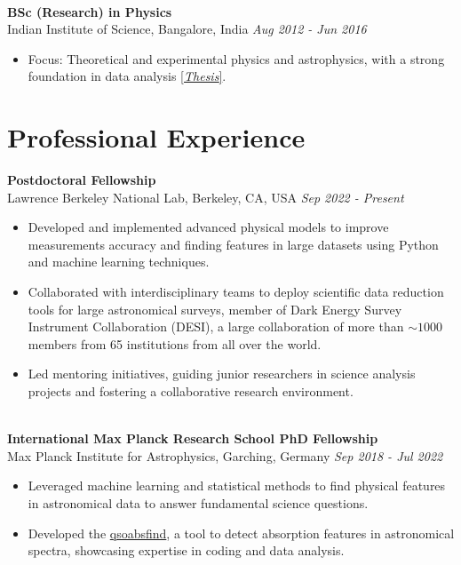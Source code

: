\documentclass[a4paper,10pt]{article}
\begin{document}
\noindent\\
\textbf{BSc (Research) in Physics} \\
Indian Institute of Science, Bangalore, India \hfill \textit{Aug 2012 - Jun 2016} \\
\begin{itemize}[noitemsep, topsep=0pt]
    \item Focus: Theoretical and experimental physics and astrophysics, with a strong foundation in data analysis \href{https://raw.githubusercontent.com/abhi0395/mycv/main/files/BS_thesis.pdf}{[\textit{Thesis}]}.
\end{itemize}

\section*{Professional Experience}
\noindent
\textbf{Postdoctoral Fellowship} \\
Lawrence Berkeley National Lab, Berkeley, CA, USA \hfill \textit{Sep 2022 - Present} \\
\begin{itemize}[noitemsep, topsep=0pt]
    \item Developed and implemented advanced physical models to improve measurements accuracy and finding features in large datasets using Python and machine learning techniques.
    \item Collaborated with interdisciplinary teams to deploy scientific data reduction tools for large astronomical surveys, member of Dark Energy Survey Instrument Collaboration (DESI), a large collaboration of more than $\sim1000$ members from 65 institutions from all over the world.
        \item Led mentoring initiatives, guiding junior researchers in science analysis projects and fostering a collaborative research environment.
\end{itemize}

\noindent \\
\textbf{International Max Planck Research School PhD Fellowship} \\
Max Planck Institute for Astrophysics, Garching, Germany \hfill \textit{Sep 2018 - Jul 2022} \\
\begin{itemize}[noitemsep, topsep=0pt]
    \item Leveraged machine learning and statistical methods to find physical features in astronomical data to answer fundamental science questions.
    \item Developed the \href{https://github.com/abhi0395/qsoabsfind}{qsoabsfind}, a tool to detect absorption features in astronomical spectra, showcasing expertise in coding and data analysis.
\end{itemize}
\end{document}

